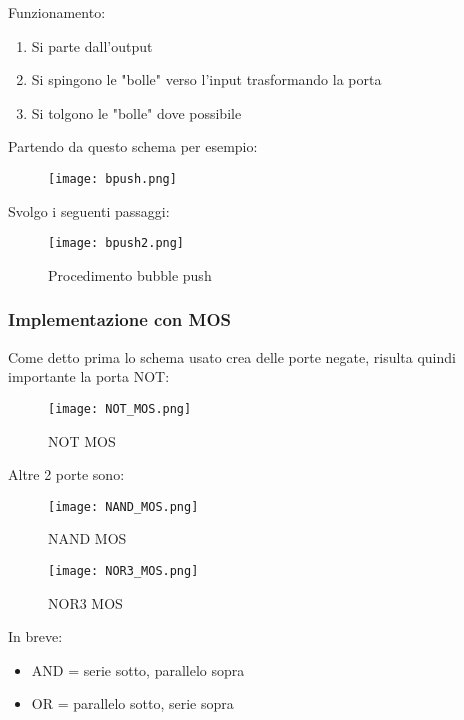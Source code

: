 \documentclass{article}
\begin{document}
Funzionamento:
\begin{enumerate}
    \item Si parte dall'output
    \item Si spingono le "bolle" verso l'input trasformando la porta
    \item Si tolgono le "bolle" dove possibile
\end{enumerate}

\vspace{4pt}

Partendo da questo schema per esempio:
\begin{figure}[ht]
    \centering
    \texttt{[image: bpush.png]}
    \label{fig:bub_push}
\end{figure}

Svolgo i seguenti passaggi: 

\begin{figure}[ht]
    \centering
    \texttt{[image: bpush2.png]}
    \caption{Procedimento bubble push}
    \label{fig:bub_push2}
\end{figure}

\subsubsection{Implementazione con MOS}

Come detto prima lo schema usato crea delle porte negate, risulta quindi importante la porta NOT:

\begin{figure}[ht]
    \centering
    \texttt{[image: NOT\_MOS.png]}
    \caption{NOT MOS}
    \label{fig:not_mos}
\end{figure}

Altre 2 porte sono:

\begin{figure}[ht]
    \centering
    \texttt{[image: NAND\_MOS.png]}
    \caption{NAND MOS}
    \label{fig:nand_mos}
\end{figure}


\begin{figure}[ht]
    \centering
    \texttt{[image: NOR3\_MOS.png]}
    \caption{NOR3 MOS}
    \label{fig:nor3_mos}
\end{figure}

In breve:
\begin{itemize}
    \item AND = serie sotto, parallelo sopra
    \item OR = parallelo sotto, serie sopra
\end{itemize}
\end{document}
